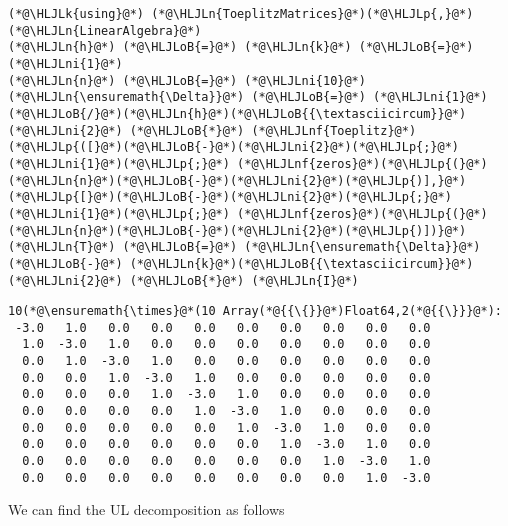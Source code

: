 \documentclass[12pt,landscape]{article}
\newcommand{\HLJLk}[1]{\textcolor[RGB]{148,91,176}{\textbf{#1}}}
\newcommand{\HLJLn}[1]{#1}
\newcommand{\HLJLnf}[1]{\textcolor[RGB]{66,102,213}{#1}}
\newcommand{\HLJLni}[1]{\textcolor[RGB]{59,151,46}{#1}}
\newcommand{\HLJLoB}[1]{\textcolor[RGB]{102,102,102}{\textbf{#1}}}
\newcommand{\HLJLp}[1]{#1}
\begin{document}
{\begin{lstlisting}
(*@\HLJLk{using}@*) (*@\HLJLn{ToeplitzMatrices}@*)(*@\HLJLp{,}@*) (*@\HLJLn{LinearAlgebra}@*)
(*@\HLJLn{h}@*) (*@\HLJLoB{=}@*) (*@\HLJLn{k}@*) (*@\HLJLoB{=}@*) (*@\HLJLni{1}@*)
(*@\HLJLn{n}@*) (*@\HLJLoB{=}@*) (*@\HLJLni{10}@*)
(*@\HLJLn{\ensuremath{\Delta}}@*) (*@\HLJLoB{=}@*) (*@\HLJLni{1}@*)(*@\HLJLoB{/}@*)(*@\HLJLn{h}@*)(*@\HLJLoB{{\textasciicircum}}@*)(*@\HLJLni{2}@*) (*@\HLJLoB{*}@*) (*@\HLJLnf{Toeplitz}@*)(*@\HLJLp{([}@*)(*@\HLJLoB{-}@*)(*@\HLJLni{2}@*)(*@\HLJLp{;}@*) (*@\HLJLni{1}@*)(*@\HLJLp{;}@*) (*@\HLJLnf{zeros}@*)(*@\HLJLp{(}@*)(*@\HLJLn{n}@*)(*@\HLJLoB{-}@*)(*@\HLJLni{2}@*)(*@\HLJLp{)],}@*) (*@\HLJLp{[}@*)(*@\HLJLoB{-}@*)(*@\HLJLni{2}@*)(*@\HLJLp{;}@*) (*@\HLJLni{1}@*)(*@\HLJLp{;}@*) (*@\HLJLnf{zeros}@*)(*@\HLJLp{(}@*)(*@\HLJLn{n}@*)(*@\HLJLoB{-}@*)(*@\HLJLni{2}@*)(*@\HLJLp{)])}@*)
(*@\HLJLn{T}@*) (*@\HLJLoB{=}@*) (*@\HLJLn{\ensuremath{\Delta}}@*) (*@\HLJLoB{-}@*) (*@\HLJLn{k}@*)(*@\HLJLoB{{\textasciicircum}}@*)(*@\HLJLni{2}@*) (*@\HLJLoB{*}@*) (*@\HLJLn{I}@*)
\end{lstlisting}
{\Large
\begin{lstlisting}
10(*@\ensuremath{\times}@*(10 Array(*@{{\{}}@*)Float64,2(*@{{\}}}@*):
 -3.0   1.0   0.0   0.0   0.0   0.0   0.0   0.0   0.0   0.0
  1.0  -3.0   1.0   0.0   0.0   0.0   0.0   0.0   0.0   0.0
  0.0   1.0  -3.0   1.0   0.0   0.0   0.0   0.0   0.0   0.0
  0.0   0.0   1.0  -3.0   1.0   0.0   0.0   0.0   0.0   0.0
  0.0   0.0   0.0   1.0  -3.0   1.0   0.0   0.0   0.0   0.0
  0.0   0.0   0.0   0.0   1.0  -3.0   1.0   0.0   0.0   0.0
  0.0   0.0   0.0   0.0   0.0   1.0  -3.0   1.0   0.0   0.0
  0.0   0.0   0.0   0.0   0.0   0.0   1.0  -3.0   1.0   0.0
  0.0   0.0   0.0   0.0   0.0   0.0   0.0   1.0  -3.0   1.0
  0.0   0.0   0.0   0.0   0.0   0.0   0.0   0.0   1.0  -3.0
\end{lstlisting}}


We can find the UL decomposition as follows


}
\end{document}
